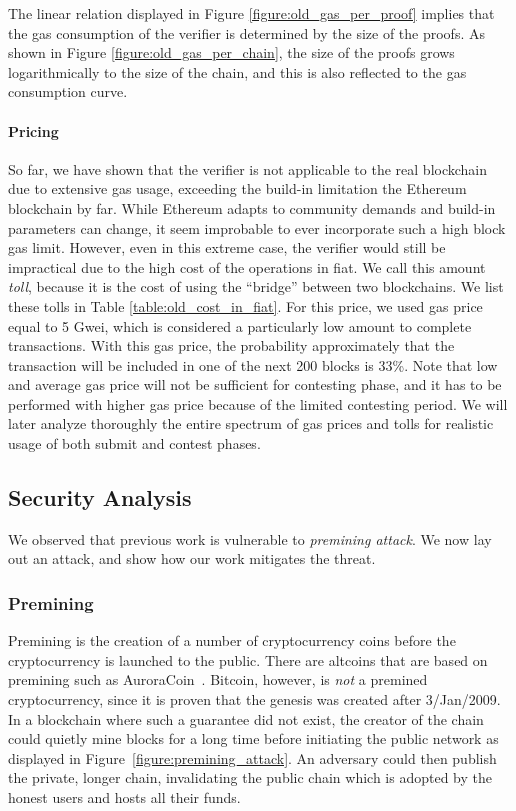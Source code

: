The linear relation displayed in Figure \ref{figure:old_gas_per_proof} implies
that the gas consumption of the verifier is determined by the size of the
proofs. As shown in Figure \ref{figure:old_gas_per_chain}, the size of the
proofs grows logarithmically to the size of the chain, and this is also
reflected to the gas consumption curve.



\paragraph{Pricing}

So far, we have shown that the verifier is not applicable to the real
blockchain due to extensive gas usage, exceeding the build-in limitation the
Ethereum blockchain by far. While Ethereum adapts to community demands and
build-in parameters can change, it seem improbable to ever incorporate such a
high block gas limit. However, even in this extreme case, the verifier would
still be impractical due to the high cost of the operations in fiat. We call
this amount \emph{toll}, because it is the cost of using the ``bridge'' between
two blockchains. We list these tolls in Table \ref{table:old_cost_in_fiat}. For
this price, we used gas price equal to 5 Gwei, which is considered a
particularly low amount to complete transactions. With this gas price, the
probability approximately that the transaction will be included in one of the
next 200 blocks is 33\%. Note that low and average gas price will not be
sufficient for contesting phase, and it has to be performed with higher gas
price because of the limited contesting period. We will later analyze
thoroughly the entire spectrum of gas prices and tolls for realistic usage of
both submit and contest phases.



\subsection{Security Analysis}

We observed that previous work is vulnerable to \emph{premining attack}. We now
lay out an attack, and show how our work mitigates the threat.
\subsubsection{Premining} Premining is the creation of a number of
cryptocurrency coins before the cryptocurrency is launched to the public. There
are altcoins that are based on premining such as AuroraCoin~\cite{aurora}.
Bitcoin, however, is \emph{not} a premined cryptocurrency, since it is proven
that the genesis was created after 3/Jan/2009. In a blockchain where such a
guarantee did not exist, the creator of the chain could quietly mine blocks for
a long time before initiating the public network as displayed in
Figure~\ref{figure:premining_attack}. An adversary could then publish the
private, longer chain, invalidating the public chain which is adopted by the
honest users and hosts all their funds.

